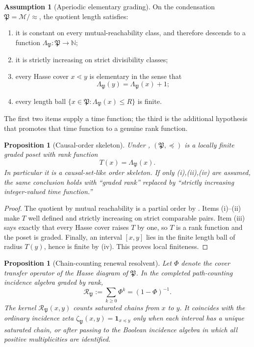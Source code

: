 \documentclass[11pt]{article}
\newtheorem{proposition}[theorem]{Proposition}
\theoremstyle{definition}
\newtheorem{assumption}{Assumption}[section]
\theoremstyle{remark}
\newcommand{\N}{\mathbb{N}}
\newcommand{\Pp}{\mathfrak{P}}
\newcommand{\M}{\mathcal{M}}
\newcommand{\one}{\mathbf{1}}
\begin{document}
\begin{assumption}[Aperiodic elementary grading]
\label{ass:aperiodic}
On the condensation \(\Pp=\M/{\approx}\), the quotient length satisfies:
\begin{enumerate}[label=\textup{(\roman*)},leftmargin=2.3em]
\item it is constant on every mutual-reachability class, and therefore descends
      to a function \(\Lambda_{\Pp}:\Pp\to\N\);
\item it is strictly increasing on strict divisibility classes;
\item every Hasse cover \(x\lessdot y\) is elementary in the sense that
      \[
        \Lambda_{\Pp}(y)=\Lambda_{\Pp}(x)+1;
      \]
\item every length ball \(\{x\in\Pp:\Lambda_{\Pp}(x)\le R\}\) is finite.
\end{enumerate}
The first two items supply a time function; the third is the additional
hypothesis that promotes that time function to a genuine rank function.
\end{assumption}

\begin{proposition}[Causal-order skeleton]
\label{prop:causal-skeleton}
Under , \((\Pp,\preceq)\) is a locally finite graded poset
with rank function
\[
  T(x)=\Lambda_{\Pp}(x).
\]
In particular it is a causal-set-like order skeleton.  If only
\textup{(i),(ii),(iv)} are assumed, the same conclusion holds
with ``graded rank'' replaced by ``strictly increasing integer-valued time
function.''
\end{proposition}

\begin{proof}
The quotient by mutual reachability is a partial order by .
Items \textup{(i)}--\textup{(ii)} make \(T\) well defined and strictly increasing
on strict comparable pairs.  Item \textup{(iii)} says exactly that every Hasse
cover raises \(T\) by one, so \(T\) is a rank function and the poset is graded.
Finally, an interval \([x,y]\) lies in the finite length ball of radius
\(T(y)\), hence is finite by \textup{(iv)}.  This proves local finiteness.
\end{proof}

\begin{proposition}[Chain-counting renewal resolvent]
\label{prop:incidence-zeta}
Let $\Phi$ denote the cover transfer operator of the Hasse diagram of $\Pp$.  In
the completed path-counting incidence algebra \cite{stanley} graded by rank,
\[
 \mathcal R_{\Pp}:=\sum_{k\ge0}\Phi^k=(1-\Phi)^{-1}.
\]
The kernel $\mathcal R_{\Pp}(x,y)$ counts saturated chains from $x$ to $y$.  It
coincides with the ordinary incidence zeta $\zeta_{\Pp}(x,y)=\one_{x\preceq y}$
only when each interval has a unique saturated chain, or after passing to the
Boolean incidence algebra in which all positive multiplicities are identified.
\end{proposition}
\end{document}
